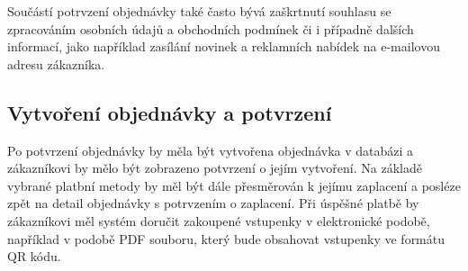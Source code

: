 Součástí potrvzení objednávky také často bývá zaškrtnutí souhlasu se zpracováním osobních údajů a obchodních podmínek či i případně dalších informací, jako například zasílání novinek a reklamních nabídek na e-mailovou adresu zákazníka.

\subsection{Vytvoření objednávky a potvrzení}
\label{subsec:specifikace-dokonceni-objednavky-vytvoreni-objednavky-a-potvrzeni}
Po potvrzení objednávky by měla být vytvořena objednávka v databázi a zákazníkovi by mělo být zobrazeno potvrzení o jejím vytvoření.
Na základě vybrané platbní metody by měl být dále přesměrován k jejímu zaplacení a posléze zpět na detail objednávky s potrvzením o zaplacení.
Při úspěšné platbě by zákazníkovi měl systém doručit zakoupené vstupenky v elektronické podobě, například v podobě PDF souboru, který bude obsahovat vstupenky ve formátu QR kódu.
